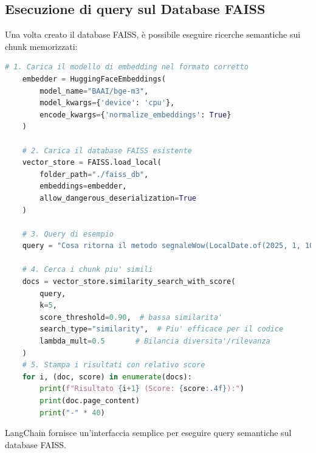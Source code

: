 \documentclass[12pt,a4paper,openright,twoside]{book}
\begin{document}
\subsection{Esecuzione di query sul Database FAISS}
    Una volta creato il database FAISS, è possibile eseguire ricerche semantiche sui chunk memorizzati:

    \begin{lstlisting}[language=Python, caption={Esecuzione di una query sul database FAISS}, label={lst:query}]
    # 1. Carica il modello di embedding nel formato corretto
    embedder = HuggingFaceEmbeddings(
        model_name="BAAI/bge-m3",
        model_kwargs={'device': 'cpu'},
        encode_kwargs={'normalize_embeddings': True}
    )

    # 2. Carica il database FAISS esistente
    vector_store = FAISS.load_local(
        folder_path="./faiss_db",
        embeddings=embedder,
        allow_dangerous_deserialization=True
    )

    # 3. Query di esempio
    query = "Cosa ritorna il metodo segnaleWow(LocalDate.of(2025, 1, 10))?"

    # 4. Cerca i chunk piu' simili
    docs = vector_store.similarity_search_with_score(
        query,
        k=5,
        score_threshold=0.90,  # bassa similarita'
        search_type="similarity",  # Piu' efficace per il codice
        lambda_mult=0.5       # Bilancia diversita'/rilevanza
    )
    # 5. Stampa i risultati con relativo score
    for i, (doc, score) in enumerate(docs):
        print(f"Risultato {i+1} (Score: {score:.4f}):")
        print(doc.page_content)
        print("-" * 40)
    \end{lstlisting}
LangChain fornisce un'interfaccia semplice per eseguire query semantiche sul database FAISS.
\end{document}
